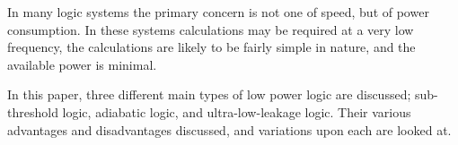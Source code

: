 In many logic systems the primary concern is not one of speed, but of power consumption.
In these systems calculations may be required at a very low frequency, the calculations are likely to be fairly simple in nature, and the available power is minimal.

In this paper, three different main types of low power logic are discussed; sub-threshold logic, adiabatic logic, and ultra-low-leakage logic.
Their various advantages and disadvantages discussed, and variations upon each are looked at.
